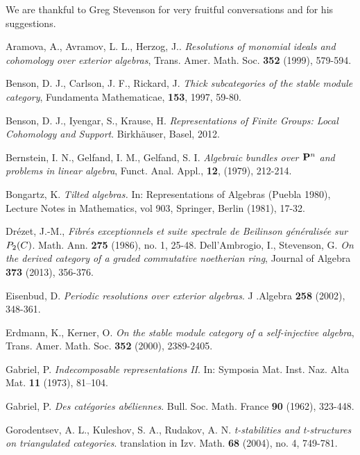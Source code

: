 \documentclass[10pt]{amsart}
\begin{document}
  We are thankful to Greg Stevenson for very fruitful conversations and for his suggestions.
 \begin{thebibliography}{99}

 Aramova, A., Avramov, L. L., Herzog, J..
{\it Resolutions of monomial ideals and cohomology over exterior algebras},
Trans. Amer. Math. Soc. {\bf 352} (1999), 579-594.

 Benson, D. J., Carlson, J. F., Rickard, J. 
{\it Thick subcategories of the stable module category}, Fundamenta Mathematicae, {\bf 153}, 1997, 59-80.

 Benson, D. J., Iyengar, S., Krause, H. {\em Representations of Finite Groups: Local Cohomology and Support}. Birkh\"auser, Basel, 2012.

 Bernstein, I. N., Gelfand, I. M., Gelfand, S. I.
{\it Algebraic bundles over ${\bf P}^n$ and problems in linear algebra},
Funct. Anal. Appl., {\bf 12}, (1979), 212-214.

 Bongartz, K. {\it Tilted algebras.} In: Representations of Algebras (Puebla 1980), Lecture Notes in Mathematics, vol 903, Springer, Berlin (1981), 17-32.

 Dr\'ezet, J.-M., {\it Fibr\'es exceptionnels et suite spectrale de Beilinson g\'en\'eralis\'ee sur $P\sb 2(C)$}. 
Math. Ann.  {\bf 275}  (1986),  no. 1, 25-48. 
 Dell'Ambrogio, I., Stevenson, G. {\em On the derived category of a graded commutative noetherian ring}, Journal of Algebra {\bf 373} (2013), 356-376.
 
 Eisenbud, D. {\it Periodic resolutions over exterior algebras}. 
J .Algebra {\bf 258} (2002), 348-361.

 Erdmann, K., Kerner, O. {\it On the stable module category of a self-injective algebra}, Trans. Amer. Math. Soc. {\bf 352} (2000), 2389-2405.

 Gabriel, P. {\em Indecomposable representations II}. In:  Symposia Mat. Inst. Naz. Alta Mat. {\bf 11} (1973), 81--104.

 Gabriel, P. {\em Des cat\'egories ab\'eliennes}. Bull. Soc. Math. France {\bf 90} (1962), 323-448.

 Gorodentsev, A. L., Kuleshov, S. A., Rudakov, A. N. {\em t-stabilities and t-structures on triangulated categories}. translation in Izv. Math. {\bf 68} (2004), no. 4, 749-781.


\end{thebibliography}
\end{document}
